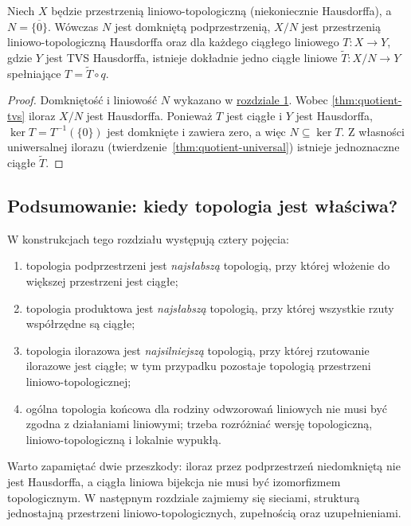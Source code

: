 \begin{twierdzenie}[Hausdorffyzacja]\label{thm:hausdorffization}
Niech $X$ będzie przestrzenią liniowo-topologiczną
(niekoniecznie Hausdorffa), a $N=\overline{\{0\}}$.
Wówczas $N$ jest domkniętą podprzestrzenią, $X/N$
jest przestrzenią liniowo-topologiczną Hausdorffa
oraz dla każdego ciągłego liniowego $T:X\to Y$,
gdzie $Y$ jest TVS Hausdorffa, istnieje dokładnie
jedno ciągłe liniowe $\widetilde T:X/N\to Y$
spełniające $T=\widetilde T\circ q$.
\end{twierdzenie}
\begin{proof}
Domkniętość i liniowość $N$ wykazano w \hyperref[sec:tvs]{rozdziale 1}. Wobec
\ref{thm:quotient-tvs} iloraz $X/N$ jest Hausdorffa.
Ponieważ $T$ jest ciągłe i $Y$ jest Hausdorffa,
$\ker T=T^{-1}(\{0\})$ jest domknięte i zawiera zero,
a więc $N\subseteq\ker T$. Z własności uniwersalnej
ilorazu (twierdzenie~\ref{thm:quotient-universal})
istnieje jednoznaczne ciągłe $\widetilde T$.
\end{proof}

\subsection{Podsumowanie: kiedy topologia jest właściwa?}

W konstrukcjach tego rozdziału występują cztery pojęcia:
\begin{enumerate}[label=\textup{(\roman*)}]
\item topologia podprzestrzeni jest \emph{najsłabszą} topologią,
      przy której włożenie do większej przestrzeni jest ciągłe;
\item topologia produktowa jest \emph{najsłabszą} topologią,
      przy której wszystkie rzuty współrzędne są ciągłe;
\item topologia ilorazowa jest \emph{najsilniejszą} topologią,
      przy której rzutowanie ilorazowe jest ciągłe; w tym
      przypadku pozostaje topologią przestrzeni liniowo-topologicznej;
\item ogólna topologia końcowa dla rodziny odwzorowań liniowych
      nie musi być zgodna z działaniami liniowymi; trzeba
      rozróżniać wersję topologiczną, liniowo-topologiczną
      i lokalnie wypukłą.
\end{enumerate}

Warto zapamiętać dwie przeszkody: iloraz przez podprzestrzeń
niedomkniętą nie jest Hausdorffa, a ciągła liniowa bijekcja
nie musi być izomorfizmem topologicznym.
W następnym rozdziale zajmiemy się sieciami, strukturą jednostajną
przestrzeni liniowo-topologicznych, zupełnością oraz uzupełnieniami.
